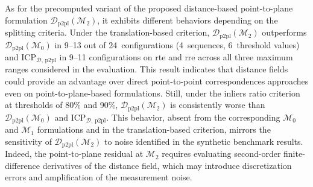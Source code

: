
As for the precomputed variant of the proposed distance-based point-to-plane
formulation $\mathcal{D}_\mathrm{p2pl}(\mathcal{M}_2)$, it exhibits different
behaviors depending on the splitting criteria.
Under the translation-based criterion,
$\mathcal{D}_\mathrm{p2pl}(\mathcal{M}_2)$ outperforms
$\mathcal{D}_\mathrm{p2pl}(\mathcal{M}_0)$ in 9--13 out of 24~configurations
(4~sequences, 6~threshold values) and
$\mathrm{ICP}_{\mathcal{D},\,\mathrm{p2pl}}$ in 9--11 configurations on
\gls{rte} and \gls{rre} across all three maximum ranges considered in the
evaluation. This result indicates that distance fields could provide an
advantage over direct point-to-point correspondences approaches
even on point-to-plane-based formulations.
Still, under the inliers ratio criterion at thresholds of
80\% and 90\%, $\mathcal{D}_\mathrm{p2pl}(\mathcal{M}_2)$ is consistently worse
than $\mathcal{D}_\mathrm{p2pl}(\mathcal{M}_0)$ and
$\mathrm{ICP}_{\mathcal{D},\,\mathrm{p2pl}}$. This behavior,
absent from the corresponding $\mathcal{M}_0$ and $\mathcal{M}_1$
formulations and in the translation-based criterion,
mirrors the sensitivity of $\mathcal{D}_\mathrm{p2pl}(\mathcal{M}_2)$ to noise
identified in the synthetic benchmark results. Indeed, the point-to-plane
residual at $\mathcal{M}_2$ requires evaluating second-order finite-difference
derivatives of the distance field, which may introduce discretization errors
and amplification of the measurement noise.


